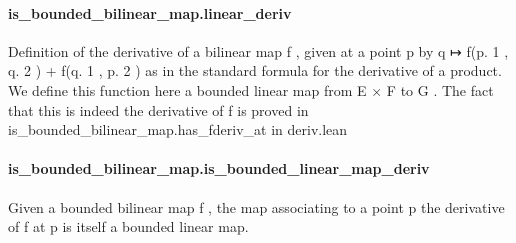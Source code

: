 \documentclass{article}
\begin{document}
\paragraph{is\_bounded\_bilinear\_map.linear\_deriv}
\par
Definition of the derivative of a bilinear map 
\colorbox[RGB]{253,246,227}{{{{\color[RGB]{101, 123, 131} f }}}}, given at a point 
\colorbox[RGB]{253,246,227}{{{{\color[RGB]{101, 123, 131} p }}}} by
\colorbox[RGB]{253,246,227}{{{{\color[RGB]{101, 123, 131} q ↦ f(p. }}}{{{\color[RGB]{108, 113, 196} 1 }}}{{{\color[RGB]{101, 123, 131} , q. }}}{{{\color[RGB]{108, 113, 196} 2 }}}{{{\color[RGB]{101, 123, 131} )  }}}{{{\color[RGB]{181, 137, 0} + }}}{{{\color[RGB]{101, 123, 131}  f(q. }}}{{{\color[RGB]{108, 113, 196} 1 }}}{{{\color[RGB]{101, 123, 131} , p. }}}{{{\color[RGB]{108, 113, 196} 2 }}}{{{\color[RGB]{101, 123, 131} ) }}}} as in the standard formula for the derivative of a product.
We define this function here a bounded linear map from 
\colorbox[RGB]{253,246,227}{{{{\color[RGB]{101, 123, 131} E × F }}}} to 
\colorbox[RGB]{253,246,227}{{{{\color[RGB]{101, 123, 131} G }}}}. The fact that this
is indeed the derivative of 
\colorbox[RGB]{253,246,227}{{{{\color[RGB]{101, 123, 131} f }}}} is proved in 
\colorbox[RGB]{253,246,227}{{{{\color[RGB]{101, 123, 131} is\_bounded\_bilinear\_map.has\_fderiv\_at }}}} in
\colorbox[RGB]{253,246,227}{{{{\color[RGB]{101, 123, 131} deriv.lean }}}}\paragraph{is\_bounded\_bilinear\_map.is\_bounded\_linear\_map\_deriv}
\par
Given a bounded bilinear map 
\colorbox[RGB]{253,246,227}{{{{\color[RGB]{101, 123, 131} f }}}}, the map associating to a point 
\colorbox[RGB]{253,246,227}{{{{\color[RGB]{101, 123, 131} p }}}} the derivative of 
\colorbox[RGB]{253,246,227}{{{{\color[RGB]{101, 123, 131} f }}}} at
\colorbox[RGB]{253,246,227}{{{{\color[RGB]{101, 123, 131} p }}}} is itself a bounded linear map.
\end{document}
